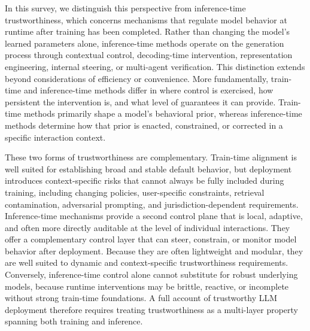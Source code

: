 In this survey, we distinguish this perspective from inference-time trustworthiness, which concerns mechanisms that regulate model behavior at runtime after training has been completed. Rather than changing the model’s learned parameters alone, inference-time methods operate on the generation process through contextual control, decoding-time intervention, representation engineering, internal steering, or multi-agent verification. This distinction extends beyond considerations of efficiency or convenience. More fundamentally, train-time and inference-time methods differ in where control is exercised, how persistent the intervention is, and what level of guarantees it can provide. Train-time methods primarily shape a model’s behavioral prior, whereas inference-time methods determine how that prior is enacted, constrained, or corrected in a specific interaction context.

These two forms of trustworthiness are complementary. Train-time alignment is well suited for establishing broad and stable default behavior, but deployment introduces context-specific risks that cannot always be fully included during training, including changing policies, user-specific constraints, retrieval contamination, adversarial prompting, and jurisdiction-dependent requirements. Inference-time mechanisms provide a second control plane that is local, adaptive, and often more directly auditable at the level of individual interactions. They offer a complementary control layer that can steer, constrain, or monitor model behavior after deployment. Because they are often lightweight and modular, they are well suited to dynamic and context-specific trustworthiness requirements. Conversely, inference-time control alone cannot substitute for robust underlying models, because runtime interventions may be brittle, reactive, or incomplete without strong train-time foundations. A full account of trustworthy LLM deployment therefore requires treating trustworthiness as a multi-layer property spanning both training and inference.




